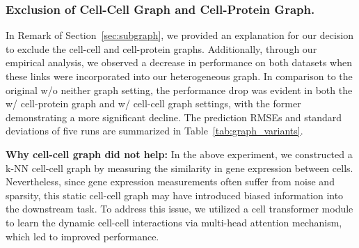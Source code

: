 \subsubsection{Exclusion of Cell-Cell Graph and Cell-Protein Graph.}\label{app:remark}
In Remark of Section~\ref{sec:subgraph}, we provided an explanation for our decision to exclude the cell-cell and cell-protein graphs. Additionally, through our empirical analysis, we observed a decrease in performance on both datasets when these links were incorporated into our heterogeneous graph. In comparison to the original w/o neither graph setting, the performance drop was evident in both the w/ cell-protein graph and w/ cell-cell graph settings, with the former demonstrating a more significant decline. The prediction RMSEs and standard deviations of five runs are summarized in Table~\ref{tab:graph_variants}.

\begin{table}[h]
\vspace{-0.5em}
\caption{The prediction RMSEs on different graph variants.}\label{tab:graph_variants}
\vspace{-1.2em}
\vspace{-1.2em}
\end{table}

\noindent \textbf{Why cell-cell graph did not help:} In the above experiment, we constructed a k-NN cell-cell graph by measuring the similarity in gene expression between cells. Nevertheless, since gene expression measurements often suffer from noise and sparsity, this static cell-cell graph may have introduced biased information into the downstream task. To address this issue, we utilized a cell transformer module to learn the dynamic cell-cell interactions via multi-head attention mechanism, which led to improved performance.

